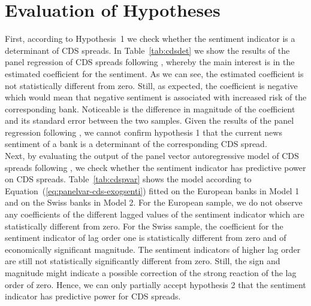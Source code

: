 \section{Evaluation of Hypotheses} \label{sec:results}

First, according to \mbox{Hypothesis~1} we check whether the sentiment indicator is a determinant of CDS spreads. In \mbox{Table~\ref{tab:cdsdet}} we show the results of the panel regression of CDS spreads following \cite{annaert2013}, whereby the main interest is in the estimated coefficient for the sentiment. As we can see, the estimated coefficient is not statistically different from zero. Still, as expected, the coefficient is negative which would mean that negative sentiment is associated with increased risk of the corresponding bank. Noticeable is the difference in magnitude of the coefficient and its standard error between the two samples. Given the results of the panel regression following \cite{annaert2013}, we cannot confirm hypothesis 1 that the current news sentiment of a bank is a determinant of the corresponding CDS spread. \\



Next, by evaluating the output of the panel vector autoregressive model of CDS spreads following \cite{cathcart2020}, we check whether the sentiment indicator has predictive power on CDS spreads. \mbox{Table~\ref{tab:cdspvar}} shows the model according to \mbox{Equation~(\ref{eq:panelvar-cds-exogsenti})} fitted on the European banks in Model 1 and on the Swiss banks in Model 2. For the European sample, we do not observe any coefficients of the different lagged values of the sentiment indicator which are statistically different from zero. For the Swiss sample, the coefficient for the sentiment indicator of lag order one is statistically different from zero and of economically significant magnitude. The sentiment indicators of higher lag order are still not statistically significantly different from zero. Still, the sign and magnitude might indicate a possible correction of the strong reaction of the lag order of zero. Hence, we can only partially accept hypothesis 2 that the sentiment indicator has predictive power for CDS spreads. \\



